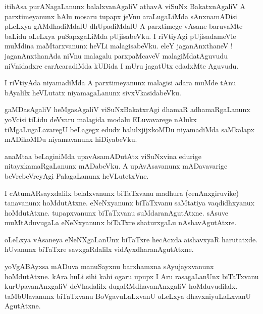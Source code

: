 \documentclass{article}
\begin{document}
\begin{mn}%
itihAsa purANagaLanunx balalxvanAgaliV athavA viSuNx BakatxnAgaliV A parxtimeyanunx hAlu mosaru 
tupapx jeVnu araLugaLiMda sAnxnamADisi pLeLxya gAMdhadiMdalU dhUpadiMdalU A parxtimege vAsane 
baruvaMte baLidu oLeLxya puSapxgaLiMda pUjisabeVku. I riVtiyAgi pUjisadameVle muMdina maMtarxvanunx 
heVLi malagisabeVku. eleY jaganAnxthaneV ! jaganAnxthanAda niVnu malagalu parxpaMcaveV 
malagiMdatAguvudu niVnidadxre carAcaradiMda kUDida I mUru jagatUtx edadxMte Aguvudu.
\end{mn}

\begin{mn}%
I riVtiyAda niyamadiMda A parxtimeyanunx malagisi adara muMde tAnu bAyalilx heVLutatx niyamagaLanunx 
sivxVkasidabeVku.
\end{mn}

\begin{mn}%
gaMDasAgaliV heMgasAgaliV viSuNxBakatxrAgi dhamaR adhamaRgaLanunx yoVcisi tiLidu deVvaru malagida 
modalu ELuvavarege nAlukx tiMgaLugaLavaregU beLagegx edudx halulxjijxkoMDu niyamadiMda saMkalapx 
mADikoMDu niyamavanunx hiDiyabeVku.
\end{mn}

\begin{mn}%
anaMtaa beLaginiMda upavAsamADutAtx viSuNxvina edurige nitayxkamaRgaLanunx mADabeVku. A 
upAvAsavanunx mADavavarige beVrebeVreyAgi PalagaLanunx heVLutetxVne.
\end{mn}

\begin{mn}%
I cAtumARsayxdalilx belalxvanunx biTaTxvanu madhura (cenAnxgiruvike) tanavanunx hoMdutAtxne. 
eNeNxyanunx biTaTxvanu saMtatiya vaqdidhxyanux hoMdutAtxne. tupapxvanunx biTaTxvanu 
suMdaranAgutAtxne. sAsuve muMtAduvugaLa eNeNxyanunx biTaTxre shaturxgaLu nAshavAgutAtxre.
\end{mn}

\begin{mn}%
oLeLxya vAsaneya eNeNXgaLanUnx biTaTxre hecAcxda aishavxyaR harutatxde. hUvanunx biTaTxre 
savxgaRdalilx vidAyxdharanAgutAtxne.
\end{mn}

\begin{mn}%
yoVgABAyxsa mADuva manuSayxnu barxhamxna sAyujayxvanunx hoMdutAtxne. kAra huLi sihi kahi ogaru upupx 
I Aru rasagaLanUnx biTaTxvanu kurUpavanAnxgaliV deVhadalilx dugaRMdhavanAnxgaliV hoMduvudilalx. 
taMbUlavanunx biTaTxvanu BoVgavuLaLxvanU oLeLxya dhavxniyuLaLxvanU AgutAtxne.
\end{mn}
\end{document}
